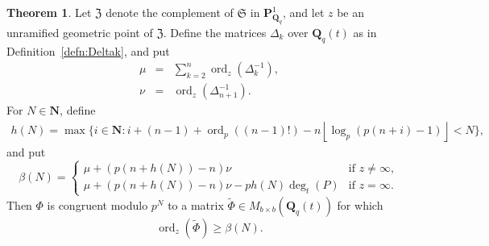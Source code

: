 \documentclass[a4paper,11pt]{article}
\numberwithin{equation}{section}
\providecommand{\floor}[1]{\left\lfloor#1\right\rfloor}   %
\newcommand{\NN}{\mathbf{N}} %
\newcommand{\QQ}{\mathbf{Q}} %
\DeclareMathOperator{\ord}{ord}          %
\theoremstyle{definition}
\newtheorem{thm}{Theorem}[section]
\begin{document}
\begin{thm} \label{thm:Gerkmann}
Let $\mathfrak{Z}$ denote the complement of $\mathfrak{S}$ in 
$\mathbf{P}^{1}_{\mathbf{Q}_q}$, and let $z$ be an unramified geometric point 
of $\mathfrak{Z}$. Define the matrices $\Delta_k$ over $\QQ_q(t)$ as in 
Definition~\ref{defn:Deltak}, and put
\begin{eqnarray*}
\mu &=& \sum_{k=2}^n \ord_z(\Delta_k^{-1}), \\
\nu &=& \ord_z(\Delta_{n+1}^{-1}).
\end{eqnarray*}
For $N \in \NN$, define 
\begin{align*}
h(N) = \max \{ i \in \NN : i+(n-1)+\ord_p ((n-1)!)-n \floor{\log_p(p(n+i)-1)} < N \},
\end{align*}
and put
\[
\beta(N) = \begin{cases}
\mu +(p(n+h(N))-n) \nu & \mbox{if $z \neq \infty$}, \\
\mu +(p(n+h(N))-n) \nu - p h(N) \deg_t(P) & \mbox{if $z = \infty$}.
\end{cases}
\]
Then $\Phi$ is congruent modulo $p^N$ to a matrix 
$\tilde{\Phi} \in M_{b \times b}(\QQ_q(t))$ for which
\begin{equation*}
\ord_z(\tilde{\Phi}) \geq \beta(N).
\end{equation*}
\end{thm}
\end{document}
